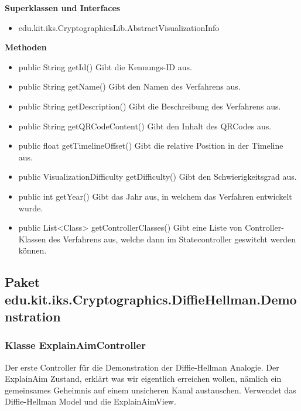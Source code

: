 \documentclass{article}
\begin{document}
      \textbf{Superklassen und Interfaces}
      \begin{itemize}
        \item edu.kit.iks.CryptographicsLib.AbstractVisualizationInfo
      \end{itemize}
      
      \textbf{Methoden}
      \begin{itemize}
        \item public String getId() \newline
        Gibt die Kennungs-ID aus.
        \item public String getName() \newline
        Gibt den Namen des Verfahrens aus.
        \item public String getDescription() \newline
        Gibt die Beschreibung des Verfahrens aus.
        \item public String getQRCodeContent() \newline
        Gibt den Inhalt des QRCodes aus.
        \item public float getTimelineOffset() \newline
        Gibt die relative Position in der Timeline aus.
        \item public VisualizationDifficulty getDifficulty() \newline
        Gibt den Schwierigkeitsgrad aus.
        \item public int getYear() \newline
        Gibt das Jahr aus, in welchem das Verfahren entwickelt wurde.
        \item public List<Class> getControllerClasses() \newline
        Gibt eine Liste von Controller-Klassen des Verfahrens aus, welche dann im Statecontroller geswitcht werden können.
      \end{itemize}

\subsection{Paket edu.kit.iks.Cryptographics.DiffieHellman.Demonstration}

\subsubsection{Klasse ExplainAimController}
      Der erste Controller für die Demonstration der Diffie-Hellman Analogie.
      Der ExplainAim Zustand, erklärt was wir eigentlich erreichen wollen,
      nämlich ein gemeinsames Geheimnis auf einem unsicheren Kanal austauschen.
      Verwendet das Diffie-Hellman Model und die ExplainAimView.
\end{document}
